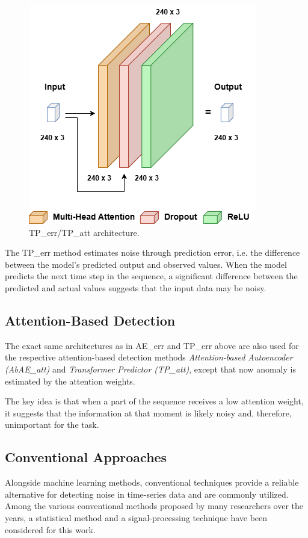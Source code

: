 \documentclass[conference]{IEEEtran}
\begin{document}
\begin{figure}[tb]
    \centering
    \includegraphics[width=0.65\columnwidth]{images/Fig3.png}
    \caption{\label{fig:Fig3} TP\_err/TP\_att architecture.}
\end{figure}

The TP\_err method estimates noise through prediction error, i.e. the
difference between the model's predicted output and observed
values. When the model predicts the next time step in the sequence, a
significant difference between the predicted and actual values
suggests that the input data may be noisy.



\subsection{Attention-Based Detection}

The exact same architectures as in AE\_err and TP\_err above are also used
for the respective attention-based detection methods
\emph{Attention-based Autoencoder (AbAE\_att)} and \emph{Transformer
Predictor (TP\_att)}, except that now anomaly is estimated by the
attention weights.

The key idea is that when a part of the sequence receives a low
attention weight, it suggests that the information at that moment is
likely noisy and, therefore, unimportant for the task.


\subsection{Conventional Approaches}

Alongside machine learning methods, conventional techniques provide a
reliable alternative for detecting noise in time-series data and are
commonly utilized. Among the various conventional methods proposed by
many researchers over the years, a statistical method and a
signal-processing technique have been considered for this work.
\end{document}
